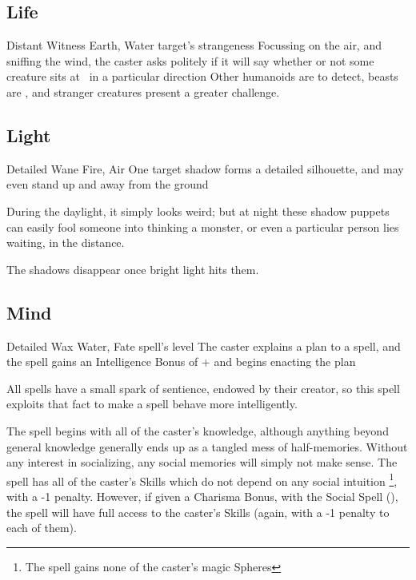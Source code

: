 \begin{multicols}{2}
\subsection{Life}


  {Distant}%
  {Witness}%
  {Earth, Water}%
  {target's strangeness}%
  {Focussing on the air, and sniffing the wind, the caster asks politely if it will say whether or not some creature sits at \spellRange\ in a particular direction}%
  {Other humanoids are \tn[7] to detect, beasts are \tn[9], and stranger creatures present a greater challenge.}


\subsection{Light}



  {Detailed}%
  {Wane}%
  {Fire, Air}%
  {}%
  {One target shadow forms a detailed silhouette, and may even stand up and away from the ground}%
  {During the daylight, it simply looks weird; but at night these shadow puppets can easily fool someone into thinking a monster, or even a particular person lies waiting, in the distance.

  The shadows disappear once bright light hits them.}

\subsection{Mind}

  {Detailed}%
  {Wax}%
  {Water, Fate}%
  {spell's level}%
  {The caster explains a plan to a spell, and the spell gains an Intelligence Bonus of + and begins enacting the plan}%
  {
  All spells have a small spark of sentience, endowed by their creator, so this spell exploits that fact to make a spell behave more intelligently.

  The spell begins with all of the caster's knowledge, although anything beyond general knowledge generally ends up as a tangled mess of half-memories.
  Without any interest in socializing, any social memories will simply not make sense.
  The spell has all of the caster's Skills which do not depend on any social intuition%
  \footnote{The spell gains none of the caster's magic Spheres},
  with a -1 penalty.
  However, if given a Charisma Bonus, with the Social Spell (), the spell will have full access to the caster's Skills (again, with a -1 penalty to each of them).

}
\end{multicols}
